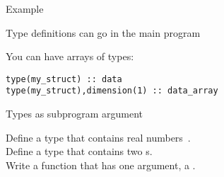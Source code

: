 \begin{block}{Example}
  \label{sl:ftype-ex}
  \begin{multicols}{2}
    \columnbreak
  \end{multicols}
  Type definitions can go in the main program
\end{block}

You can have arrays of types:
\begin{lstlisting}
type(my_struct) :: data
type(my_struct),dimension(1) :: data_array
\end{lstlisting}

\begin{block}{Types as subprogram argument}
  \label{sl:ftype-pass}
  \begin{multicols}{2}
    \columnbreak
  \end{multicols}

\end{block}

\begin{exercise}
  \label{ex:ftype-rect}
  Define a type  that contains real numbers~.\\
  Define a type  that contains two s.\\
  Write a function  that has one argument, a .
\end{exercise}
